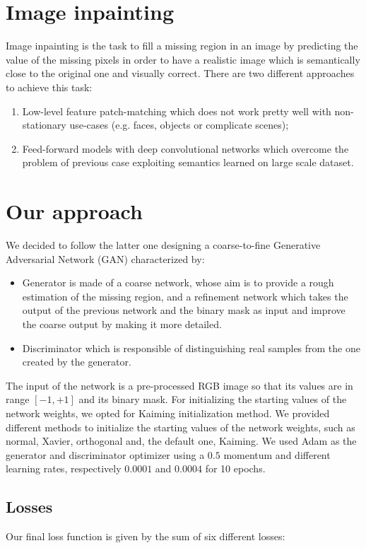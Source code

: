 \documentclass[10pt,twocolumn,letterpaper]{article}
\begin{document}
\section{Image inpainting}
Image inpainting is the task to fill a missing region
in an image by predicting the value of the missing pixels in order to have a
realistic image which is semantically close to the original one and visually
correct. There are two different approaches to achieve this task:
\begin{enumerate}
  \item Low-level feature patch-matching which does not work pretty well with
    non-stationary use-cases (e.g. faces, objects or complicate scenes);
  \item	Feed-forward models with deep convolutional networks which overcome the
    problem of previous case exploiting semantics learned on large scale
    dataset.
\end{enumerate}
\section{Our approach}
We decided to follow the latter one designing a coarse-to-fine Generative
Adversarial Network (GAN) characterized by:
\begin{itemize}
	\item Generator is made of a coarse network, whose aim is to provide a rough
    estimation of the missing region, and a refinement network which takes the
    output of the previous network and the binary mask as input and improve the
    coarse output by making it more detailed.
  \item	Discriminator which is responsible of distinguishing real samples from
    the one created by the generator.
\end{itemize}
The input of the network is a pre-processed RGB image so that its values are in
range \([-1,+1]\) and its binary mask. For initializing the starting values of
the network weights, we opted for Kaiming initialization method. We provided
different methods to initialize the starting values of the network weights, such
as normal, Xavier, orthogonal and, the default one, Kaiming. We used Adam as the
generator and discriminator optimizer using a \(0.5\) momentum and different
learning rates, respectively \(0.0001\) and \(0.0004\) for 10 epochs.

\subsection{Losses}
Our final loss function is given by the sum of six different losses:
\end{document}
